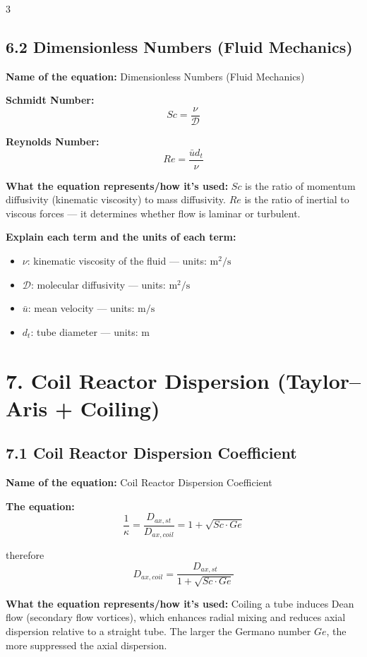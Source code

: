 \documentclass[8pt]{extarticle}
\begin{document}
\begin{multicols*}{3}
\subsection*{6.2 Dimensionless Numbers (Fluid Mechanics)}

\textbf{Name of the equation:} Dimensionless Numbers (Fluid Mechanics)

\textbf{Schmidt Number:}
\[
Sc=\frac{\nu}{\mathcal{D}}
\]

\textbf{Reynolds Number:}
\[
Re=\frac{\bar{u}d_t}{\nu}
\]

\textbf{What the equation represents/how it's used:} \(Sc\) is the ratio of momentum diffusivity (kinematic viscosity) to mass diffusivity. \(Re\) is the ratio of inertial to viscous forces --- it determines whether flow is laminar or turbulent.

\textbf{Explain each term and the units of each term:}
\begin{itemize}
\item \(\nu\): kinematic viscosity of the fluid --- units: \(\mathrm{m^2/s}\)
\item \(\mathcal{D}\): molecular diffusivity --- units: \(\mathrm{m^2/s}\)
\item \(\bar{u}\): mean velocity --- units: \(\mathrm{m/s}\)
\item \(d_t\): tube diameter --- units: \(\mathrm{m}\)
\end{itemize}

\section*{7. Coil Reactor Dispersion (Taylor--Aris + Coiling)}

\subsection*{7.1 Coil Reactor Dispersion Coefficient}

\textbf{Name of the equation:} Coil Reactor Dispersion Coefficient

\textbf{The equation:}
\[
\frac{1}{\kappa}
=
\frac{D_{ax,st}}{D_{ax,coil}}
=
1+\sqrt{Sc\cdot Ge}
\]

therefore
\[
D_{ax,coil}
=
\frac{D_{ax,st}}{1+\sqrt{Sc\cdot Ge}}
\]

\textbf{What the equation represents/how it's used:} Coiling a tube induces Dean flow (secondary flow vortices), which enhances radial mixing and reduces axial dispersion relative to a straight tube. The larger the Germano number \(Ge\), the more suppressed the axial dispersion.


\end{multicols*}
\end{document}
